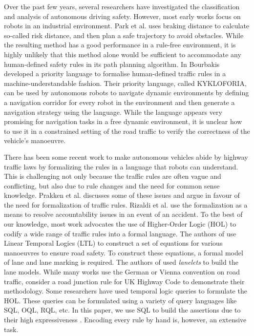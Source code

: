 Over the past few years, several researchers have investigated the classification and analysis of autonomous driving safety. However, most early works focus on robots in an industrial environment. Park et al. \cite{safespace} uses braking distance to calculate so-called risk distance, and then plan a safe trajectory to avoid obstacles. While the resulting method has a good performance in a rule-free environment, it is highly unlikely that this method alone would be sufficient to accommodate any human-defined safety rules in its path planning algorithm. In \cite{prioritylanguage} Bourbakis developed a priority language to formalise human-defined traffic rules in a machine-understandable fashion. Their priority language, called KYKLOFORIA, can be used by autonomous robots to navigate dynamic environments by defining a navigation corridor for every robot in the environment and then generate a navigation strategy using the language. While the language appears very promising for navigation tasks in a free dynamic environment, it is unclear how to use it in a constrained setting of the road traffic to verify the correctness of the vehicle's manoeuvre.

There has been some recent work to make autonomous vehicles abide by highway traffic laws by formalizing the rules in a language that robots can understand. This is challenging not only because the traffic rules are often vague and conflicting, but also due to rule changes and the need for common sense knowledge. Prakken et al.\cite{lawabidingstudy} discusses some of these issues and argue in favour of the need for formalization of traffic rules. Rizaldi et al. \cite{acountability} use the formalization as a means to resolve accountability issues in an event of an accident. To the best of our knowledge, most work \cite{acountability, esterle, rizaldi, alves} advocates the use of Higher-Order Logic (HOL) to codify a wide range of traffic rules into a formal language. The authors of \cite{acountability, esterle, rizaldi, alves} use Linear Temporal Logics (LTL) to construct a set of equations for various manoeuvres to ensure road safety. To construct these equations, a formal model of lane and lane marking is required. The authors of \cite{rizaldi} used \textit{lanelets} \cite{lanelets2014} to build the lane models. While many works use the German or Vienna convention \cite{vienna} on road traffic, \cite{alves} consider a road junction rule for UK Highway Code \cite{highwayCode} to demonstrate their methodology. Some researchers \cite{sqlhuang, sqlgueffaz} have used temporal logic queries to formulate the HOL. These queries can be formulated using a variety of query languages like SQL, OQL, RQL, etc. In this paper, we use SQL to build the assertions due to their high expressiveness \cite{sqllibkin}. Encoding every rule by hand is, however, an extensive task. 

